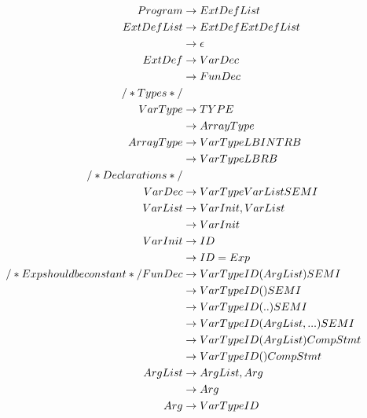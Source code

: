\begin{alignat*}{8}
    Program     &\rightarrow \space ExtDefList\\
    ExtDefList  &\rightarrow \space ExtDef  \space ExtDefList\\
                &\rightarrow \space \epsilon\\
    ExtDef      &\rightarrow \space  VarDec\\
                &\rightarrow \space  FunDec\\
    /* Types*/\\
    VarType     &\rightarrow \space  TYPE\\
                &\rightarrow \space  ArrayType\\
    ArrayType   &\rightarrow \space  VarType \space LB \space INT \space RB\\
                &\rightarrow \space  VarType \space LB \space RB\\
    /* Declarations */\\
    VarDec      &\rightarrow \space  VarType \space VarList \space SEMI\\
    VarList     &\rightarrow \space  VarInit \space , \space VarList\\
                &\rightarrow \space  VarInit\\
    VarInit     &\rightarrow \space  ID\\
                &\rightarrow \space  ID \space = \space Exp\\
                /* Exp should be constant*/
    FunDec      &\rightarrow \space VarType \space ID \space ( \space ArgList \space ) \space SEMI\\
                &\rightarrow \space VarType \space ID \space ( \space ) \space SEMI\\
                &\rightarrow \space VarType \space ID \space ( .. \space ) \space SEMI\\
                &\rightarrow \space VarType \space ID \space ( \space ArgList \space , \space ... \space ) \space SEMI\\
                &\rightarrow \space VarType \space ID \space ( \space ArgList \space ) \space CompStmt\\
                &\rightarrow \space VarType \space ID \space ( \space ) \space CompStmt\\
    ArgList     &\rightarrow \space ArgList \space , \space Arg\\
                &\rightarrow \space Arg\\
    Arg         &\rightarrow \space VarType \space ID\\

\end{alignat*}
